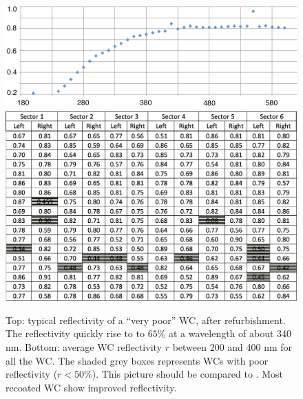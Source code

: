 \begin{figure}
	\centering
	\includegraphics[width=0.98\columnwidth,keepaspectratio]{img/winstoConeSample1Reflectivity.png}
	\includegraphics[width=0.98\columnwidth,keepaspectratio]{img/wcStatusAfter.png}
	\caption{Top: typical reflectivity of a ``very poor'' WC, after refurbishment.
            The reflectivity quickly rise to to $65\%$ at a wavelength of about 340 nm. Bottom: average WC reflectivity $r$ between 200 and 400 nm for
			all the WC. The shaded grey boxes represents WCs with poor reflectivity ($r < 50\%$).
            This picture should be compared to . Most recoated WC show improved reflectivity.}
	\label{fig:wcStatusAfter}
\end{figure}


